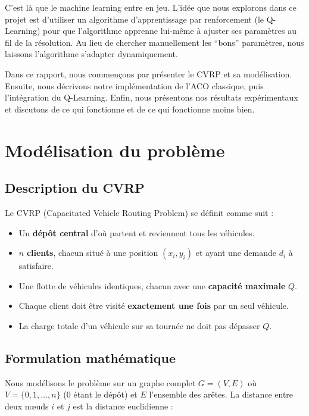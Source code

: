 \documentclass[12pt, a4paper]{article}
\begin{document}
C'est là que le machine learning entre en jeu. L'idée que nous explorons dans ce projet est d'utiliser un algorithme d'apprentissage par renforcement (le Q-Learning) pour que l'algorithme apprenne lui-même à ajuster ses paramètres au fil de la résolution. Au lieu de chercher manuellement les ``bons'' paramètres, nous laissons l'algorithme s'adapter dynamiquement.

Dans ce rapport, nous commençons par présenter le CVRP et sa modélisation. Ensuite, nous décrivons notre implémentation de l'ACO classique, puis l'intégration du Q-Learning. Enfin, nous présentons nos résultats expérimentaux et discutons de ce qui fonctionne et de ce qui fonctionne moins bien.

\section{Modélisation du problème}

\subsection{Description du CVRP}

Le CVRP (Capacitated Vehicle Routing Problem) se définit comme suit :

\begin{itemize}
    \item Un \textbf{dépôt central} d'où partent et reviennent tous les véhicules.
    \item $n$ \textbf{clients}, chacun situé à une position $(x_i, y_i)$ et ayant une demande $d_i$ à satisfaire.
    \item Une flotte de véhicules identiques, chacun avec une \textbf{capacité maximale} $Q$.
    \item Chaque client doit être visité \textbf{exactement une fois} par un seul véhicule.
    \item La charge totale d'un véhicule sur sa tournée ne doit pas dépasser $Q$.
\end{itemize}

\subsection{Formulation mathématique}

Nous modélisons le problème sur un graphe complet $G = (V, E)$ où $V = \{0, 1, \ldots, n\}$ ($0$ étant le dépôt) et $E$ l'ensemble des arêtes. La distance entre deux n\oe uds $i$ et $j$ est la distance euclidienne :
\end{document}
